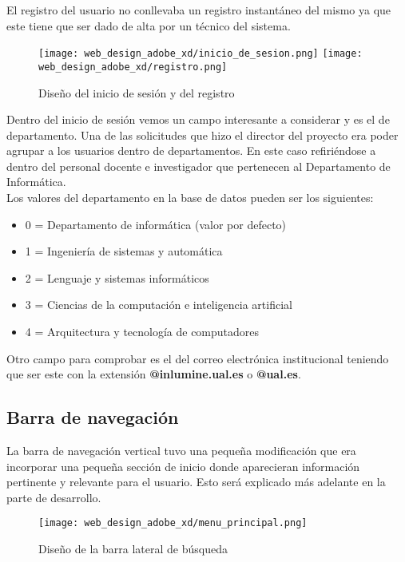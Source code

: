 El registro del usuario no conllevaba un registro instantáneo del mismo ya que este tiene que ser dado de alta por un técnico del sistema.

\begin{figure}
    \begin{center}
        \texttt{[image: web\_design\_adobe\_xd/inicio\_de\_sesion.png]}
        \texttt{[image: web\_design\_adobe\_xd/registro.png]}
        \caption{Diseño del inicio de sesión y del registro}
    \end{center}
\end{figure}

Dentro del inicio de sesión vemos un campo interesante a considerar y es el de departamento. Una de las solicitudes que hizo el director del proyecto era poder agrupar a los usuarios dentro de departamentos. En este caso refiriéndose a dentro del personal docente e investigador que pertenecen al Departamento de Informática.
\\Los valores del departamento en la base de datos pueden ser los siguientes:

\begin{itemize}
    \item 0 = Departamento de informática (valor por defecto)
    \item 1 = Ingeniería de sistemas y automática
    \item 2 = Lenguaje y sistemas informáticos
    \item 3 = Ciencias de la computación e inteligencia artificial
    \item 4 = Arquitectura y tecnología de computadores
\end{itemize}

Otro campo para comprobar es el del correo electrónica institucional teniendo que ser este con la extensión \textbf{@inlumine.ual.es} o \textbf{@ual.es}.

\subsection{Barra de navegación}

La barra de navegación vertical tuvo una pequeña modificación que era incorporar una pequeña sección de inicio donde aparecieran información pertinente y relevante para el usuario. Esto será explicado más adelante en la parte de desarrollo.

\begin{figure}
    \begin{center}
        \texttt{[image: web\_design\_adobe\_xd/menu\_principal.png]}
        \caption{Diseño de la barra lateral de búsqueda}
    \end{center}
\end{figure}

